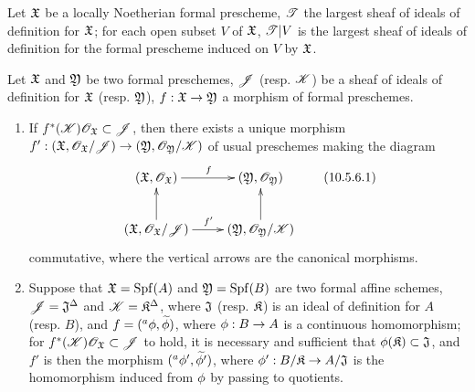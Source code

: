 \begin{cor}[10.5.5]
\label{1.10.5.5}
Let $\mathfrak{X}$ be a locally Noetherian formal prescheme, $\mathscr{T}$ the largest sheaf of ideals of definition for $\mathfrak{X}$; for each open subset $V$ of $\mathfrak{X}$, $\mathscr{T}|V$ is the largest sheaf of ideals of definition for the formal prescheme induced on $V$ by $\mathfrak{X}$.
\end{cor}

\begin{prop}[10.5.6]
\label{1.10.5.6}
Let $\mathfrak{X}$ and $\mathfrak{Y}$ be two formal preschemes, $\mathscr{J}$ (resp. $\mathscr{K}$) be a sheaf of ideals of definition for $\mathfrak{X}$ (resp. $\mathfrak{Y}$), $f:\fk{X}\to\fk{Y}$ a morphism of formal preschemes.
\begin{enumerate}[label=\emph{(\roman*)}]
  \item If $f^*(\mathscr{K})\mathscr{O}_\mathfrak{X}\subset\mathscr{J}$, then there exists a unique morphism $f':(\fk{X},\OO_\fk{X}/\sh{J})\to(\fk{Y},\OO_\fk{Y}/\sh{K})$ of usual preschemes making the diagram
    \[
      \xymatrix{
        (\fk{X},\OO_\fk{X})\ar[r]^f &
        (\fk{Y},\OO_\fk{Y})\\
        (\fk{X},\OO_\fk{X}/\sh{J})\ar[r]^{f'}\ar[u] &
        (\fk{Y},\OO_\fk{Y}/\sh{K})\ar[u]
      }
      \tag{10.5.6.1}
    \]
    commutative, where the vertical arrows are the canonical morphisms.
  \item Suppose that $\mathfrak{X}={\mathop{\mathrm{Spf}}\nolimits}(A)$ and $\mathfrak{Y}={\mathop{\mathrm{Spf}}\nolimits}(B)$ are two formal affine schemes, $\mathscr{J}=\mathfrak{J}^\Delta$ and $\mathscr{K}=\mathfrak{K}^\Delta$, where $\mathfrak{J}$ (resp. $\mathfrak{K}$) is an ideal of definition for $A$ (resp. $B$), and $f=({}^a\phi,\widetilde{\phi})$, where $\vphi:B\to A$ is a continuous homomorphism;
    for $f^*(\mathscr{K})\mathscr{O}_\mathfrak{X}\subset\mathscr{J}$ to hold, it is necessary and sufficient that $\phi(\mathfrak{K})\subset\mathfrak{J}$, and $f'$ is then the morphism $({}^a\phi',\widetilde{\phi'})$, where $\vphi':B/\fk{K}\to A/\fk{J}$ is the homomorphism induced from $\phi$ by passing to quotients.
\end{enumerate}
\end{prop}

